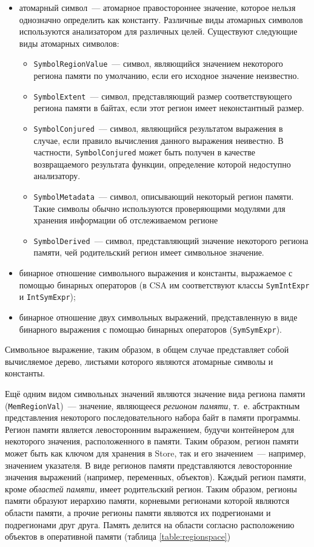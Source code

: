 \begin{itemize}
 \item атомарный символ~--- атомарное правостороннее значение, которое нельзя однозначно определить как константу. Различные виды атомарных символов используются анализатором для различных целей. Существуют следующие виды атомарных символов:
 \begin{itemize}
 \item \texttt{SymbolRegionValue}~--- символ, являющийся значением некоторого региона памяти по умолчанию, если его исходное значение неизвестно.
 \item \texttt{SymbolExtent}~--- символ, представляющий размер соответствующего региона памяти в байтах, если этот регион имеет неконстантный размер.
 \item \texttt{SymbolConjured}~--- символ, являющийся результатом выражения в случае, если правило вычисления данного выражения неивестно. В частности, \texttt{SymbolConjured} может быть получен в качестве возвращаемого результата функции, определение которой недоступно анализатору.
 \item \texttt{SymbolMetadata}~--- символ, описывающий некоторый регион памяти. Такие символы обычно используются проверяющими модулями для хранения информации об отслеживаемом регионе
 \item \texttt{SymbolDerived}~--- символ, представляющий значение некоторого региона памяти, чей родительский регион имеет символьное значение.
 \end{itemize}

 \item бинарное отношение символьного выражения и константы, выражаемое с помощью бинарных операторов (в CSA им соответствуют классы \texttt{SymIntExpr} и \texttt{IntSymExpr});
 \item бинарное отношение двух символьных выражений, представленную в виде бинарного выражения с помощью бинарных операторов (\texttt{SymSymExpr}).
\end{itemize}

Символьное выражение, таким образом, в общем случае представляет собой вычисляемое дерево, листьями которого являются атомарные символы и константы.

Ещё одним видом символьных значений являются значение вида региона памяти (\texttt{MemRegionVal})~--- значение, являющееся \textit{регионом памяти}, т.~е. абстрактным представления некоторого последовательного набора байт в памяти программы. Регион памяти является левосторонним выражением, будучи контейнером для некоторого значения, расположенного в памяти. Таким образом, регион памяти может быть как ключом для хранения в Store, так и его значением~--- например, значением указателя. В виде регионов памяти представляются левосторонние значения выражений (например, переменных, объектов). Каждый регион памяти, кроме \textit{областей памяти}, имеет родительский регион. Таким образом, регионы памяти образуют иерархию памяти, корневыми регионами которой являются области памяти, а прочие регионы памяти являются их подрегионами и подрегионами друг друга. Память делится на области согласно расположению объектов в оперативной памяти (таблица \ref{table:regionspace})

